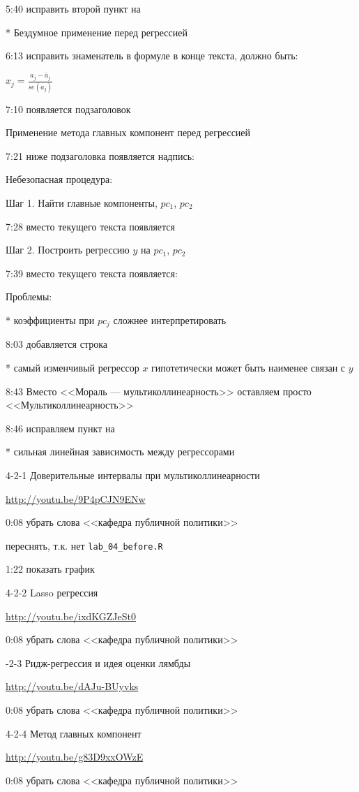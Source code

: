 \documentclass[12pt,a4paper]{article}
\begin{document}
5:40 исправить второй пункт на 

* Бездумное применение перед регрессией

6:13 исправить знаменатель в формуле в конце текста, должно быть:

$x_j=\frac{a_j-\bar{a}_j}{se(a_j)}$

7:10 появляется подзаголовок

Применение метода главных компонент перед регрессией

7:21 ниже подзаголовка появляется надпись:

Небезопасная процедура:

Шаг 1. Найти главные компоненты, $pc_1$, $pc_2$

7:28 вместо текущего текста появляется 

Шаг 2. Построить регрессию $y$ на $pc_1$, $pc_2$

7:39 вместо текущего текста появляется:

Проблемы:

* коэффициенты при $pc_j$ сложнее интерпретировать

8:03 добавляется строка

* самый изменчивый регрессор $x$ гипотетически может быть наименее связан с $y$

8:43 Вместо <<Мораль --- мультиколлинеарность>> оставляем просто <<Мультиколлинеарность>>

8:46 исправляем пункт на 

* сильная линейная зависимость между регрессорами


4-2-1 Доверительные интервалы при мультиколлинеарности

\url{http://youtu.be/9P4pCJN9ENw}

0:08 убрать слова <<кафедра публичной политики>>  

переснять, т.к. нет \verb|lab_04_before.R|

1:22  показать график


4-2-2 Lasso регрессия 

\url{http://youtu.be/ixdKGZJeSt0}

0:08 убрать слова <<кафедра публичной политики>>  


-2-3 Ридж-регрессия и идея оценки лямбды

\url{http://youtu.be/dAJu-BUyvks}

0:08 убрать слова <<кафедра публичной политики>>  



4-2-4 Метод главных компонент

\url{http://youtu.be/g83D9xxOWzE}

0:08 убрать слова <<кафедра публичной политики>>  
\end{document}
